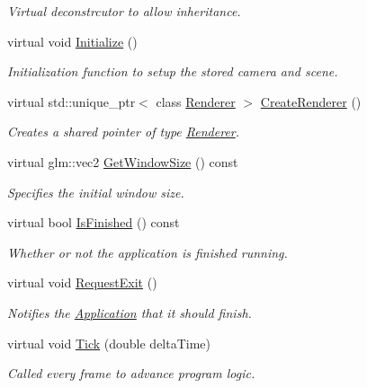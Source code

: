 \begin{DoxyCompactItemize}
\begin{DoxyCompactList}\small\item\em Virtual deconstrcutor to allow inheritance. \end{DoxyCompactList}\item 
virtual void \hyperlink{class_application_a17cf1ea4552d26a1c20f7d98d793d41d}{Initialize} ()
\begin{DoxyCompactList}\small\item\em Initialization function to setup the stored camera and scene. \end{DoxyCompactList}\item 
virtual std\+::unique\+\_\+ptr$<$ class \hyperlink{class_renderer}{Renderer} $>$ \hyperlink{class_application_a90c7fd9ecb6c8923948078903d442919}{Create\+Renderer} ()
\begin{DoxyCompactList}\small\item\em Creates a shared pointer of type \hyperlink{class_renderer}{Renderer}. \end{DoxyCompactList}\item 
virtual glm\+::vec2 \hyperlink{class_application_a3e9992f0ceae0d8beda7debccdb00534}{Get\+Window\+Size} () const 
\begin{DoxyCompactList}\small\item\em Specifies the initial window size. \end{DoxyCompactList}\item 
virtual bool \hyperlink{class_application_ae0019f2c58008791971e67f23f2d4182}{Is\+Finished} () const 
\begin{DoxyCompactList}\small\item\em Whether or not the application is finished running. \end{DoxyCompactList}\item 
virtual void \hyperlink{class_application_a9cbe96f94653eae2bb6ad5857b00fa10}{Request\+Exit} ()
\begin{DoxyCompactList}\small\item\em Notifies the \hyperlink{class_application}{Application} that it should finish. \end{DoxyCompactList}\item 
virtual void \hyperlink{class_application_a0800afd5651153d31fa775a8048d14dd}{Tick} (double delta\+Time)
\begin{DoxyCompactList}\small\item\em Called every frame to advance program logic. \end{DoxyCompactList}\item 

\end{DoxyCompactItemize}
